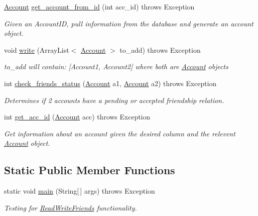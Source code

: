 \begin{DoxyCompactItemize}
\hyperlink{class_account}{Account} \hyperlink{class_read_write_friends_a56f74832f8bc0bee6c7d48aad84878eb}{get\+\_\+account\+\_\+from\+\_\+id} (int acc\+\_\+id)  throws Exception     
\begin{DoxyCompactList}\small\item\em Given an Account\+ID, pull information from the database and generate an account object. \end{DoxyCompactList}\item 
void \hyperlink{class_read_write_friends_ae754f5aa3e65cde59ad619a56f7b318e}{write} (Array\+List$<$ \hyperlink{class_account}{Account} $>$ to\+\_\+add)  throws Exception     
\begin{DoxyCompactList}\small\item\em to\+\_\+add will contain\+: \mbox{[}Account1, Account2\mbox{]} where both are \hyperlink{class_account}{Account} objects \end{DoxyCompactList}\item 
int \hyperlink{class_read_write_friends_abbe5f06f2119c20d3015b91b4b1c728f}{check\+\_\+friends\+\_\+status} (\hyperlink{class_account}{Account} a1, \hyperlink{class_account}{Account} a2)  throws Exception     
\begin{DoxyCompactList}\small\item\em Determines if 2 accounts have a pending or accepted friendship relation. \end{DoxyCompactList}\item 
\mbox{\label{class_read_write_friends_aee917f985979bdf89bb55b84cb52017c}} 
int \hyperlink{class_read_write_friends_aee917f985979bdf89bb55b84cb52017c}{get\+\_\+acc\+\_\+id} (\hyperlink{class_account}{Account} acc)  throws Exception     
\begin{DoxyCompactList}\small\item\em Get information about an account given the desired column and the relevent \hyperlink{class_account}{Account} object. \end{DoxyCompactList}\end{DoxyCompactItemize}
\subsection*{Static Public Member Functions}
\begin{DoxyCompactItemize}
\item 
\mbox{\label{class_read_write_friends_ac2039776a76fdbdc416cfa3cd16495e6}} 
static void \hyperlink{class_read_write_friends_ac2039776a76fdbdc416cfa3cd16495e6}{main} (String\mbox{[}$\,$\mbox{]} args)  throws Exception     
\begin{DoxyCompactList}\small\item\em Testing for \hyperlink{class_read_write_friends}{Read\+Write\+Friends} functionality. \end{DoxyCompactList}\end{DoxyCompactItemize}


